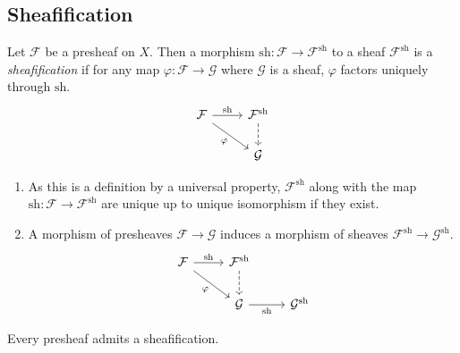 \subsection{Sheafification}
\begin{definition}
    Let \( \mathcal F \) be a presheaf on \( X \).
    Then a morphism \( \mathrm{sh} : \mathcal F \to \mathcal F^{\mathrm{sh}} \) to a sheaf \( \mathcal F^{\mathrm{sh}} \) is a \emph{sheafification} if for any map \( \varphi : \mathcal F \to \mathcal G \) where \( \mathcal G \) is a sheaf, \( \varphi \) factors uniquely through \( \mathrm{sh} \).
    \[\begin{tikzcd}
        {\mathcal F} & {\mathcal F^{\mathrm{sh}}} \\
        & {\mathcal G}
        \arrow["{\mathrm{sh}}", from=1-1, to=1-2]
        \arrow[dashed, from=1-2, to=2-2]
        \arrow["\varphi"', from=1-1, to=2-2]
    \end{tikzcd}\]
\end{definition}
\begin{remark}
    \begin{enumerate}
        \item As this is a definition by a universal property, \( \mathcal F^{\mathrm{sh}} \) along with the map \( \mathrm{sh} : \mathcal F \to \mathcal F^{\mathrm{sh}} \) are unique up to unique isomorphism if they exist.
        \item A morphism of presheaves \( \mathcal F \to \mathcal G \) induces a morphism of sheaves \( \mathcal F^{\mathrm{sh}} \to \mathcal G^{\mathrm{sh}} \).
        \[\begin{tikzcd}
            {\mathcal F} & {\mathcal F^{\mathrm{sh}}} \\
            & {\mathcal G} & {\mathcal G^{\mathrm{sh}}}
            \arrow["{\mathrm{sh}}", from=1-1, to=1-2]
            \arrow[dashed, from=1-2, to=2-2]
            \arrow["\varphi"', from=1-1, to=2-2]
            \arrow["{\mathrm{sh}}"', from=2-2, to=2-3]
        \end{tikzcd}\]
    \end{enumerate}
\end{remark}
\begin{proposition}
    Every presheaf admits a sheafification.
\end{proposition}
